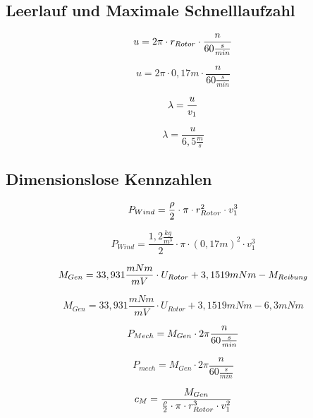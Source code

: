 \subsection{Leerlauf und Maximale Schnelllaufzahl}

\begin{equation}
    \centering
    u = 2 \pi \cdot r_{Rotor} \cdot \frac{n}{60 \frac{s}{min}}
    \label{eq:230615_Umfangsgeschwindigkeit}
\end{equation}

$$    u = 2 \pi \cdot 0,17m \cdot \frac{n}{60 \frac{s}{min}} $$

\begin{equation}
    \centering
    \lambda = \frac{u}{v_1}
    \label{eq:230615_Schnelllaufzahl}
\end{equation}

$$\lambda = \frac{u}{6,5 \frac{m}{s}}$$


\subsection{Dimensionslose Kennzahlen}

\begin{equation}
    \centering
    P_{Wind} = \frac{\rho}{2} \cdot \pi \cdot r_{Rotor}^2 \cdot v_1^3
    \label{eq:230615_Leistung_Wind}
\end{equation}

$$P_{Wind} = \frac{1,2 \frac{kg}{m^3}}{2} \cdot \pi \cdot (0,17 m)^2 \cdot v_1^3$$

\begin{equation}
    \centering
    M_{Gen} = 33,931\frac{mNm}{mV} \cdot U_{Rotor} + 3,1519 mNm - M_{Reibung}
    \label{eq:230615_Genratormoment}
\end{equation}

$$M_{Gen} = 33,931\frac{mNm}{mV} \cdot U_{Rotor} + 3,1519 mNm - 6,3mNm$$

\begin{equation}
    \centering
    P_{Mech} = M_{Gen} \cdot 2 \pi \frac{n}{60\frac{s}{min}}
    \label{eq:230615_Mechanischeleistung}
\end{equation}

$$P_{mech} = M_{Gen} \cdot 2 \pi \frac{n}{60\frac{s}{min}}$$

\begin{equation}
    \centering
    c_M = \frac{M_{Gen}}{ \frac{\rho}{2} \cdot \pi \cdot r_{Rotor}^3 \cdot v_1^2}
    \label{eq:230615_Momentenbeiwert}
\end{equation}

